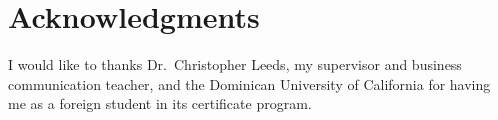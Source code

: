 \chapter*{Acknowledgments}
\label{ch:ack}

I would like to thanks Dr.~Christopher Leeds, my supervisor and business communication teacher, and the Dominican University of California for having me as a foreign student in its certificate program.
